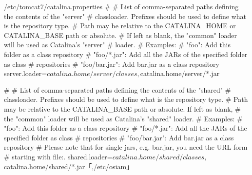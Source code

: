 \begin{lstdump}{/etc/tomcat7/catalina.properties}
#
# List of comma-separated paths defining the contents of the "server"
# classloader. Prefixes should be used to define what is the repository type.
# Path may be relative to the CATALINA_HOME or CATALINA_BASE path or absolute.
# If left as blank, the "common" loader will be used as Catalina's "server"
# loader.
# Examples:
#     "foo": Add this folder as a class repository
#     "foo/*.jar": Add all the JARs of the specified folder as class
#                  repositories
#     "foo/bar.jar": Add bar.jar as a class repository
server.loader=${catalina.home}/server/classes,${catalina.home}/server/*.jar

#
# List of comma-separated paths defining the contents of the "shared"
# classloader. Prefixes should be used to define what is the repository type.
# Path may be relative to the CATALINA_BASE path or absolute. If left as blank,
# the "common" loader will be used as Catalina's "shared" loader.
# Examples:
#     "foo": Add this folder as a class repository
#     "foo/*.jar": Add all the JARs of the specified folder as class
#                  repositories
#     "foo/bar.jar": Add bar.jar as a class repository
# Please note that for single jars, e.g. bar.jar, you need the URL form
# starting with file:.
shared.loader=${catalina.home}/shared/classes,${catalina.home}/shared/*.jar「,/etc/osiam」


\end{lstdump}
